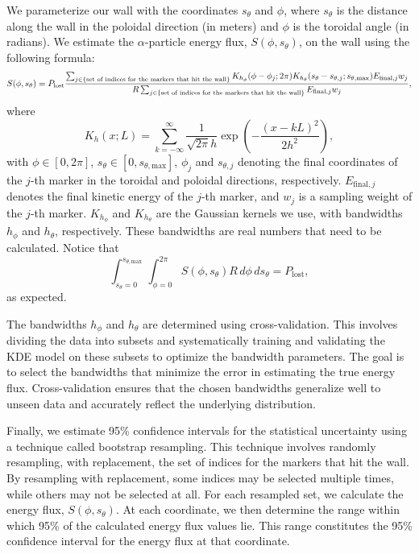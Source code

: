 \documentclass[10pt, a4paper, twoside]{article}
\begin{document}
We parameterize our wall with the coordinates \(s_\theta\) and \(\phi\), where \(s_\theta\) is the distance along the wall in the poloidal direction (in meters) and \(\phi\) is the toroidal angle (in radians). We estimate the $\alpha$-particle energy flux, \(S(\phi, s_\theta)\), on the wall using the following formula:
\[
S(\phi, s_\theta) = P_{\text{lost}}\frac{\sum_{j \in \{\text{set of indices for the markers that hit the wall}\}} K_{h_{\phi}}\qty(\phi - \phi_j; 2\pi) K_{h_{\theta}}(s_\theta - s_{\theta,j}; s_{\theta, \text{max}}) E_{\text{final}, j} w_j}{R \sum_{j \in \{\text{set of indices for the markers that hit the wall}\}} E_{\text{final}, j} w_j},
\]
where
\[
K_h(x; L) = \sum_{k=-\infty}^\infty \frac{1}{\sqrt{2\pi} h} \exp\left(-\frac{(x - kL)^2}{2h^2}\right),
\]
with \(\phi \in [0, 2\pi]\), \(s_\theta \in [0, s_{\theta, \text{max}}]\), \(\phi_j\) and \(s_{\theta,j}\) denoting the final coordinates of the \(j\)-th marker in the toroidal and poloidal directions, respectively. \(E_{\text{final}, j}\) denotes the final kinetic energy of the \(j\)-th marker, and \(w_j\) is a sampling weight of the \(j\)-th marker. \(K_{h_{\phi}}\) and \(K_{h_{\theta}}\) are the Gaussian kernels we use, with bandwidths \(h_{\phi}\) and \(h_{\theta}\), respectively. These bandwidths are real numbers that need to be calculated.
Notice that
\[
\int_{s_\theta=0}^{s_{\theta,\text{max}}}\int_{\phi=0}^{2\pi} S(\phi, s_\theta) R \, d\phi \, ds_\theta = P_{\text{lost}},
\]
as expected.

The bandwidths \(h_{\phi}\) and \(h_{\theta}\) are determined using cross-validation. This involves dividing the data into subsets and systematically training and validating the KDE model on these subsets to optimize the bandwidth parameters. The goal is to select the bandwidths that minimize the error in estimating the true energy flux. Cross-validation ensures that the chosen bandwidths generalize well to unseen data and accurately reflect the underlying distribution.

Finally, we estimate 95\% confidence intervals for the statistical uncertainty using a technique called bootstrap resampling. This technique involves randomly resampling, with replacement, the set of indices for the markers that hit the wall. By resampling with replacement, some indices may be selected multiple times, while others may not be selected at all. For each resampled set, we calculate the energy flux, \(S(\phi, s_\theta)\). At each coordinate, we then determine the range within which 95\% of the calculated energy flux values lie. This range constitutes the 95\% confidence interval for the energy flux at that coordinate.
\end{document}
